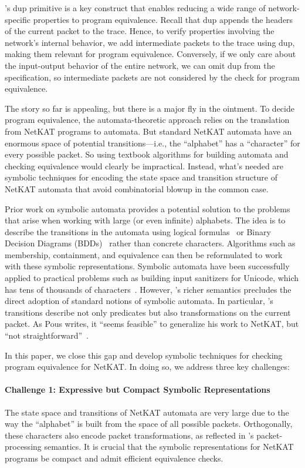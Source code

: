 \documentclass[acmsmall,dvipsnames,nonacm]{acmart}
\begin{document}
\NetKAT's $\text{dup}$ primitive is a key construct that enables
reducing a wide range of network-specific properties to program
equivalence. Recall that $\text{dup}$ appends the headers of the
current packet to the trace. Hence, to verify properties involving the
network's internal behavior, we add intermediate packets to the trace
using $\text{dup}$, making them relevant for program
equivalence. Conversely, if we only care about the input-output
behavior of the entire network, we can omit $\text{dup}$ from the
specification, so intermediate packets are not considered by the check
for program equivalence.

The story so far is appealing, but there is a major fly in the
ointment. To decide program equivalence, the automata-theoretic
approach relies on the translation from NetKAT programs to
automata. But standard NetKAT automata have an enormous space of
potential transitions---i.e., the ``alphabet'' has a ``character'' for
every possible packet. So using textbook algorithms for building
automata and checking equivalence would clearly be
impractical. Instead, what's needed are symbolic techniques for
encoding the state space and transition structure of NetKAT automata
that avoid combinatorial blowup in the common case.

Prior work on symbolic automata provides a potential solution to the
problems that arise when working with large (or even infinite)
alphabets. The idea is to describe the transitions in the automata
using logical formulas~\cite{DAntoni2014,DAntoni2017} or Binary
Decision Diagrams (BDDs)~\cite{Pous2015} rather than concrete
characters. Algorithms such as membership, containment, and
equivalence can then be reformulated to work with these symbolic
representations. Symbolic automata have been successfully applied to
practical problems such as building input sanitizers for Unicode,
which has tens of thousands of
characters~\cite{Hooimeijer2011}. However, \NetKAT's richer semantics
precludes the direct adoption of standard notions of symbolic
automata. In particular, \NetKAT's transitions describe not only
predicates but also transformations on the current packet. As Pous
writes, it ``seems feasible'' to generalize his work to NetKAT, but
``not straightforward''~\cite{Pous2015}.

In this paper, we close this gap and develop symbolic techniques for
checking program equivalence for NetKAT. In doing so, we address three
key challenges:

\paragraph{Challenge 1: Expressive but Compact Symbolic Representations}
%
The state space and transitions of NetKAT automata are very large due
to the way the ``alphabet'' is built from the space of all possible
packets. Orthogonally, these characters also encode packet
transformations, as reflected in \NetKAT's packet-processing
semantics. It is crucial that the symbolic representations for NetKAT
programs be compact and admit efficient equivalence checks.
\end{document}
